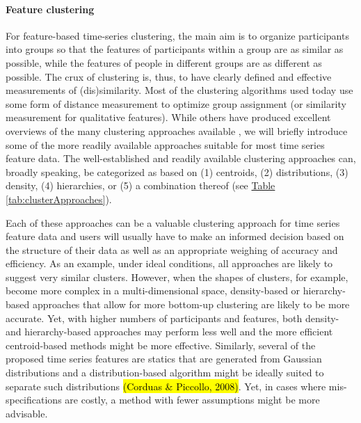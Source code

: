 \documentclass[man, 12pt, a4paper, mask, floatsintext]{apa7}
\theoremstyle{break}
\theoremstyle{plain}
\newcommand{\tblref}[2][]{\hyperref[#2]{Table \ref*{#2}#1}}
\begin{document}
\paragraph{Feature clustering}
For feature-based time-series clustering, the main aim is to organize participants into groups so that the features of participants within a group are as similar as possible, while the features of people in different groups are as different as possible. The crux of clustering is, thus, to have clearly defined and effective measurements of (dis)similarity. Most of the clustering algorithms used today use some form of distance measurement to optimize group assignment (or similarity measurement for qualitative features). While others have produced excellent overviews of the many clustering approaches available \citep[e.g.,][]{xu2015}, we will briefly introduce some of the more readily available approaches suitable for most time series feature data. The well-established and readily available clustering approaches can, broadly speaking, be categorized as based on (1) centroids, (2) distributions, (3) density, (4) hierarchies, or (5) a combination thereof (see \tblref{tab:clusterApproaches}). 

Each of these approaches can be a valuable clustering approach for time series feature data and users will usually have to make an informed decision based on the structure of their data as well as an appropriate weighing of accuracy and efficiency. As an example, under ideal conditions, all approaches are likely to suggest very similar clusters. However, when the shapes of clusters, for example, become more complex in a multi-dimensional space, density-based or hierarchy-based approaches that allow for more bottom-up clustering are likely to be more accurate. Yet, with higher numbers of participants and features, both density- and hierarchy-based approaches may perform less well and the more efficient centroid-based methods might be more effective. Similarly, several of the proposed time series features are statics that are generated from Gaussian distributions and a distribution-based algorithm might be ideally suited to separate such distributions \hl{(Corduas \& Piccollo, 2008)}. Yet, in cases where mis-specifications are costly, a method with fewer assumptions might be more advisable. 
\end{document}
